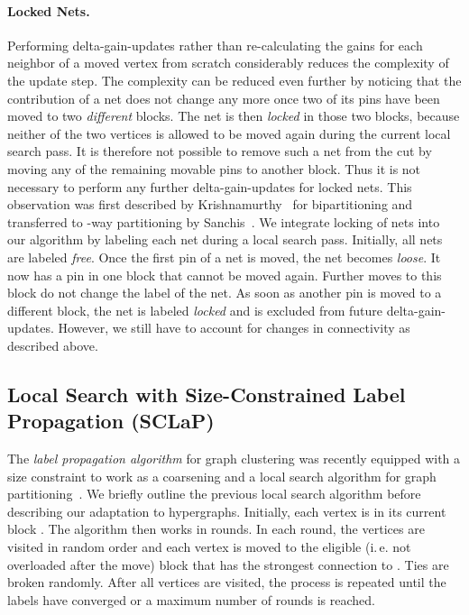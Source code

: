 \documentclass[runningheads,a4paper]{llncs}
\newcommand{\ie}{i.\,e.\xspace}
\begin{document}
\paragraph{Locked Nets.}
Performing delta-gain-updates rather than re-calculating the gains for each neighbor of a moved vertex from scratch considerably reduces the complexity of the update step.
The complexity can be reduced even further by noticing that the contribution of a net does not change any more once two of its pins have been
moved to two \emph{different} blocks. The net is then \emph{locked} in those two blocks, because neither of the two vertices is allowed to be
moved again during the current local search pass. It is therefore not possible to remove such a net from the cut by moving any of the remaining movable pins to another block. Thus it is not necessary to perform any further delta-gain-updates for locked nets.
This observation was first described by Krishnamurthy~\cite{LockedNets} for bipartitioning and transferred to -way partitioning by Sanchis~\cite{HypergraphKFM}.
We integrate locking of nets into our algorithm by labeling each net during a local search pass. Initially, all nets are labeled \emph{free}.
Once the first pin of a net is moved, the net becomes \emph{loose}. It now has a pin in one block that cannot be moved again. Further moves to this 
block do not change the label of the net. As soon as another pin is moved to a different block, the net is labeled \emph{locked} and is
excluded from future delta-gain-updates. However, we still have to account for changes in connectivity as described above.

\subsection{Local Search with Size-Constrained Label Propagation (SCLaP)} \label{LPAlocalSearch}
The \emph{label propagation algorithm} for graph
clustering was recently equipped with a size constraint to work as a coarsening and a local search
algorithm for graph partitioning~\cite{LPAgraphPartitioning}. 
We briefly outline the previous local search algorithm before describing our adaptation to hypergraphs.
Initially, each vertex  is in its current block .
The algorithm then works in rounds. In each round, the vertices are visited in random order and each
vertex  is moved to the eligible (\ie not overloaded after the move) block  
that has the strongest connection to .
Ties are broken randomly. 
After all vertices are visited, the process is repeated until the labels have converged or
a maximum number of  rounds is reached. 
\end{document}
